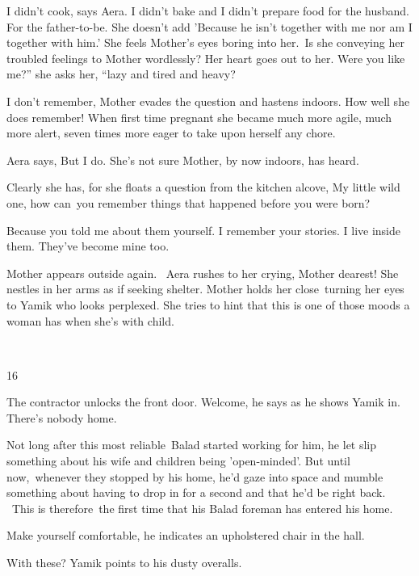 \documentclass[letterpaper]{article}
\begin{document}
{\textquotedbl}I didn't cook,{\textquotedbl} says Aera. {\textquotedbl}I didn't bake and I didn't prepare food for the
husband. For the father-to-be.{\textquotedbl} She doesn't add 'Because he isn't together with me nor am I together with
him.{}' She feels Mother's eyes boring into her.\ Is she conveying her troubled feelings to Mother wordlessly? Her
heart goes out to her. {\textquotedbl}Were you like me?'' she asks her, ``lazy and tired and heavy?{\textquotedbl} 

{\textquotedbl}I don't remember,{\textquotedbl} Mother evades the question and hastens indoors. How well she does
remember! When first time pregnant she became much more agile, much more alert, seven times more eager to take upon
herself any chore.~~~ 

Aera says, {\textquotedbl}But I do.{\textquotedbl} She's not sure Mother, by now indoors, has heard. 

Clearly she has, for she floats a question from the kitchen alcove, {\textquotedbl}My little wild one, how can~you
remember things that happened before you were born?{\textquotedbl} 

{\textquotedbl}Because you told me about them yourself. I remember your stories. I live inside them. They've become mine
too.{\textquotedbl}

Mother appears outside again. ~Aera rushes to her crying, {\textquotedbl}Mother dearest!{\textquotedbl} She nestles in
her arms as if seeking shelter. Mother holds her close~turning her eyes to Yamik who looks perplexed. She tries to hint
that this is one of those moods a woman has when she's with child. 

~

16 

The contractor unlocks the front door. {\textquotedbl}Welcome,{\textquotedbl} he says as he shows Yamik in.
{\textquotedbl}There's nobody home.{\textquotedbl} 

Not long after this most reliable\ Balad started working for him, he let slip something about his wife and children
being {}'open-minded{}'. But until now,~whenever they stopped by his home, he'd gaze into space and mumble something
about having to drop in for a second and that he'd be right back. ~This is therefore~the first time that his Balad
foreman has entered his home.

{\textquotedbl}Make yourself comfortable,{\textquotedbl} he indicates an upholstered chair in the hall.~ 

{\textquotedbl}With these?{\textquotedbl} Yamik points to his dusty overalls. 
\end{document}
